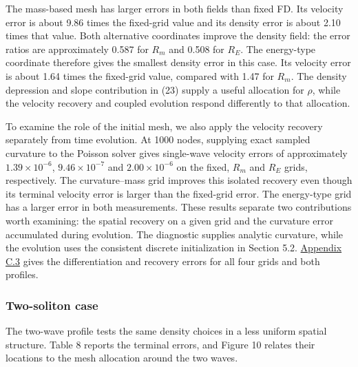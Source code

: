 \documentclass{article}
\begin{document}
The mass-based mesh has larger errors in both fields than fixed FD. Its velocity error is about 9.86 times the fixed-grid value and its density error is about 2.10 times that value. Both alternative coordinates improve the density field: the error ratios are approximately 0.587 for \(R_m\) and 0.508 for \(R_E\). The energy-type coordinate therefore gives the smallest density error in this case. Its velocity error is about 1.64 times the fixed-grid value, compared with 1.47 for \(R_m\). The density depression and slope contribution in (23) supply a useful allocation for \(\rho\), while the velocity recovery and coupled evolution respond differently to that allocation.

To examine the role of the initial mesh, we also apply the velocity recovery separately from time evolution. At 1000 nodes, supplying exact sampled curvature to the Poisson solver gives single-wave velocity errors of approximately \(1.39\times10^{-6}\), \(9.46\times10^{-7}\) and \(2.00\times10^{-6}\) on the fixed, \(R_m\) and \(R_E\) grids, respectively. The curvature--mass grid improves this isolated recovery even though its terminal velocity error is larger than the fixed-grid error. The energy-type grid has a larger error in both measurements. These results separate two contributions worth examining: the spatial recovery on a given grid and the curvature error accumulated during evolution. The diagnostic supplies analytic curvature, while the evolution uses the consistent discrete initialization in Section 5.2. \hyperref[app:recovery]{Appendix C.3} gives the differentiation and recovery errors for all four grids and both profiles.

\subsubsection*{Two-soliton case}

The two-wave profile tests the same density choices in a less uniform spatial structure. Table 8 reports the terminal errors, and Figure 10 relates their locations to the mesh allocation around the two waves.
\end{document}
